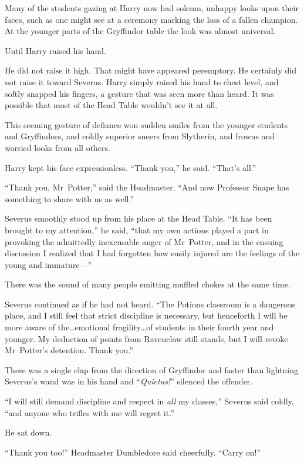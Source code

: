 Many of the students gazing at Harry now had solemn, unhappy looks upon their faces, such as one might see at a ceremony marking the loss of a fallen champion. At the younger parts of the Gryffindor table the look was almost universal.

Until Harry raised his hand.

He did not raise it high. That might have appeared peremptory. He certainly did not raise it toward Severus. Harry simply raised his hand to chest level, and softly snapped his fingers, a gesture that was seen more than heard. It was possible that most of the Head Table wouldn’t see it at all.

This seeming gesture of defiance won sudden smiles from the younger students and Gryffindors, and coldly superior sneers from Slytherin, and frowns and worried looks from all others.

Harry kept his face expressionless. “Thank you,” he said. “That’s all.”

“Thank you, Mr~Potter,” said the Headmaster. “And now Professor Snape has something to share with us as well.”

Severus smoothly stood up from his place at the Head Table. “It has been brought to my attention,” he said, “that my own actions played a part in provoking the admittedly inexcusable anger of Mr~Potter, and in the ensuing discussion I realized that I had forgotten how easily injured are the feelings of the young and immature—”

There was the sound of many people emitting muffled chokes at the same time.

Severus continued as if he had not heard. “The Potions classroom is a dangerous place, and I still feel that strict discipline is necessary, but henceforth I will be more aware of the…emotional fragility…of students in their fourth year and younger. My deduction of points from Ravenclaw still stands, but I will revoke Mr~Potter’s detention. Thank you.”

There was a single clap from the direction of Gryffindor and faster than lightning Severus’s wand was in his hand and “\emph{Quietus!}” silenced the offender.

“I will still demand discipline and respect in \emph{all} my classes,” Severus said coldly, “and anyone who trifles with me will regret it.”

He sat down.

“Thank you too!” Headmaster Dumbledore said cheerfully. “Carry on!”


